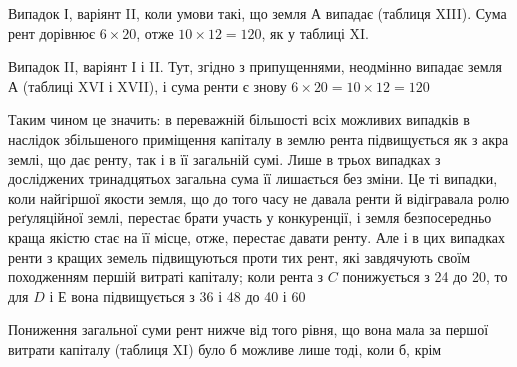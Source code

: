 Випадок І, варіянт II, коли умови такі, що земля $А$ випадає (таблиця XIII).
Сума рент дорівнює $6 × 20$, отже $10 × 12 = 120$, як у таблиці XI.

Випадок II, варіянт І і II. Тут, згідно з припущеннями, неодмінно випадає
земля $А$ (таблиці XVI і XVII), і сума ренти є знову $6 × 20 = 10 × 12 =
120$

Таким чином це значить: в переважній більшості всіх можливих випадків
в наслідок збільшеного приміщення капіталу в землю рента підвищується як
з акра землі, що дає ренту, так і в її загальній сумі. Лише в трьох випадках
з досліджених тринадцятьох загальна сума її лишається без зміни. Це ті випадки,
коли найгіршої якости земля, що до того часу не давала ренти й відігравала
ролю реґуляційної землі, перестає брати участь у конкуренції, і земля безпосередньо
краща якістю стає на її місце, отже, перестає давати ренту. Але і в
цих випадках ренти з кращих земель підвищуються проти тих рент, які завдячують
своїм походженням першій витраті капіталу; коли рента з $C$ понижується
з 24 до 20, то для $D$ і $Е$ вона підвищується з 36 і 48 до 40 і 60

Пониження загальної суми рент нижче від того рівня, що вона мала за
першої витрати капіталу (таблиця XI) було б можливе лише тоді, коли б, крім
\parbreak{}  %
